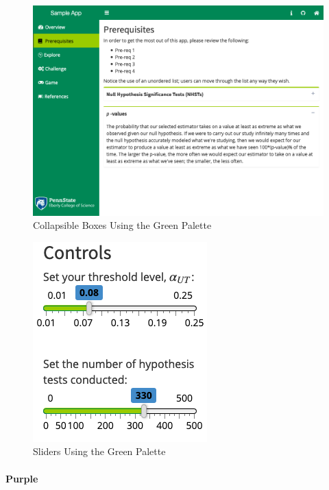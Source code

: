 \documentclass[]{book}
\let\oldparagraph\paragraph
\renewcommand{\paragraph}[1]{\oldparagraph{#1}\mbox{}}
\begin{document}
\begin{figure}

{\centering \includegraphics[width=14in]{images/greenCollapse} 

}

\caption{Collapsible Boxes Using the Green Palette}\label{fig:greenAction2}
\end{figure}

\begin{figure}

{\centering \includegraphics{images/greenSliders} 

}

\caption{Sliders Using the Green Palette}\label{fig:greenAction3}
\end{figure}

\hypertarget{purple}{%
\paragraph{Purple}\label{purple}}
\end{document}
